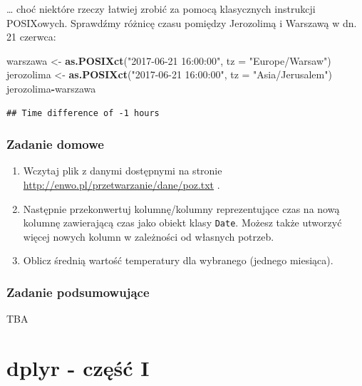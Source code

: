 \documentclass[]{book}
\newenvironment{Shaded}{\begin{snugshade}}{\end{snugshade}}
\newcommand{\KeywordTok}[1]{\textcolor[rgb]{0.13,0.29,0.53}{\textbf{#1}}}
\newcommand{\DataTypeTok}[1]{\textcolor[rgb]{0.13,0.29,0.53}{#1}}
\newcommand{\StringTok}[1]{\textcolor[rgb]{0.31,0.60,0.02}{#1}}
\newcommand{\OperatorTok}[1]{\textcolor[rgb]{0.81,0.36,0.00}{\textbf{#1}}}
\newcommand{\NormalTok}[1]{#1}
\providecommand{\tightlist}{%
  \setlength{\itemsep}{0pt}\setlength{\parskip}{0pt}}
\theoremstyle{definition}
\theoremstyle{definition}
\theoremstyle{definition}
\theoremstyle{remark}
\begin{document}
\ldots{} choć niektóre rzeczy łatwiej zrobić za pomocą klasycznych
instrukcji POSIXowych. Sprawdźmy różnicę czasu pomiędzy Jerozolimą i
Warszawą w dn. 21 czerwca:

\begin{Shaded}
\begin{Highlighting}[]
\NormalTok{warszawa <-}\StringTok{ }\KeywordTok{as.POSIXct}\NormalTok{(}\StringTok{"2017-06-21 16:00:00"}\NormalTok{, }\DataTypeTok{tz =} \StringTok{"Europe/Warsaw"}\NormalTok{)}
\NormalTok{jerozolima <-}\StringTok{  }\KeywordTok{as.POSIXct}\NormalTok{(}\StringTok{"2017-06-21 16:00:00"}\NormalTok{, }\DataTypeTok{tz =} \StringTok{"Asia/Jerusalem"}\NormalTok{)}
\NormalTok{jerozolima}\OperatorTok{-}\NormalTok{warszawa}
\end{Highlighting}
\end{Shaded}

\begin{verbatim}
## Time difference of -1 hours
\end{verbatim}

\subsection*{Zadanie domowe}\label{zadanie-domowe-4}

\begin{enumerate}
\def\labelenumi{\arabic{enumi}.}
\tightlist
\item
  Wczytaj plik z danymi dostępnymi na stronie
  \url{http://enwo.pl/przetwarzanie/dane/poz.txt} .
\item
  Następnie przekonwertuj kolumnę/kolumny reprezentujące czas na nową
  kolumnę zawierającą czas jako obiekt klasy \texttt{Date}. Możesz także
  utworzyć więcej nowych kolumn w zależności od własnych potrzeb.
\item
  Oblicz średnią wartość temperatury dla wybranego (jednego miesiąca).
\end{enumerate}

\subsection*{Zadanie podsumowujące}\label{zadanie-podsumowujace}

TBA

\chapter{dplyr - część I}\label{dplyr---czesc-i}
\end{document}
